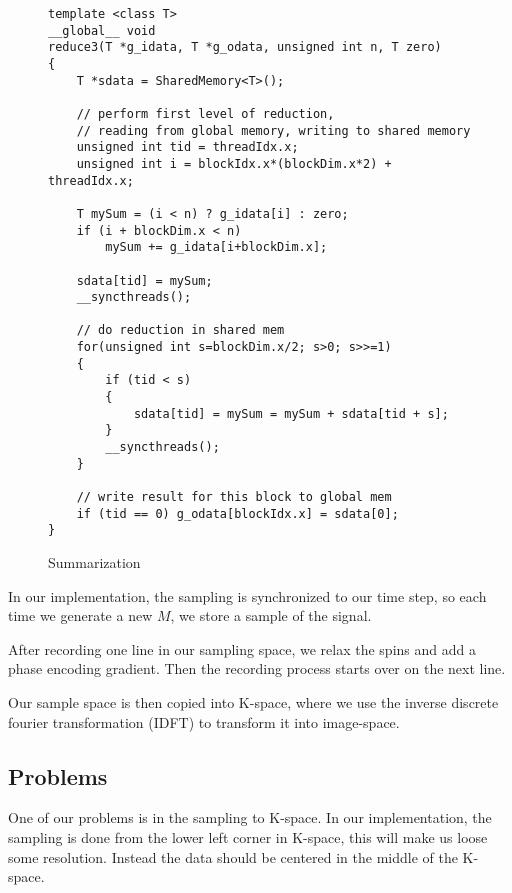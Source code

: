 \begin{figure*}[h]
\begin{lstlisting}
template <class T>
__global__ void
reduce3(T *g_idata, T *g_odata, unsigned int n, T zero)
{
    T *sdata = SharedMemory<T>();

    // perform first level of reduction,
    // reading from global memory, writing to shared memory
    unsigned int tid = threadIdx.x;
    unsigned int i = blockIdx.x*(blockDim.x*2) + threadIdx.x;

    T mySum = (i < n) ? g_idata[i] : zero;
    if (i + blockDim.x < n) 
        mySum += g_idata[i+blockDim.x];  

    sdata[tid] = mySum;
    __syncthreads();

    // do reduction in shared mem
    for(unsigned int s=blockDim.x/2; s>0; s>>=1) 
    {
        if (tid < s) 
        {
            sdata[tid] = mySum = mySum + sdata[tid + s];
        }
        __syncthreads();
    }

    // write result for this block to global mem 
    if (tid == 0) g_odata[blockIdx.x] = sdata[0];
}
\end{lstlisting}
  \caption{Summarization}
  \label{fig:reduce}
\end{figure*}

In our implementation, the sampling is synchronized to our time step,
so each time we generate a new $M$, we store a sample of the signal.

After recording one line in our sampling space, we relax the spins and
add a phase encoding gradient. Then the recording process starts over
on the next line.

Our sample space is then copied into K-space, where we use the inverse
discrete fourier transformation (IDFT) to transform it into
image-space.

\subsection{Problems}

One of our problems is in the sampling to K-space. In our
implementation, the sampling is done from the lower left corner in
K-space, this will make us loose some resolution. Instead the data
should be centered in the middle of the K-space.



